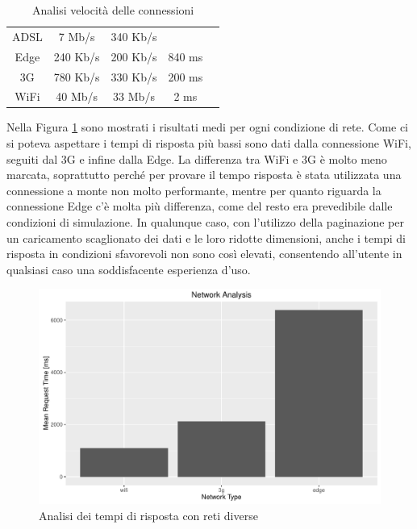 \begin{table}[ht]
	\caption{Analisi velocità delle connessioni}
	\label{table:connections-data-test}
	\begin{tabularx}{\textwidth}{CCCCC}
		\toprule
		 &  &  &   \\
		\midrule
			ADSL & 7 Mb/s & 340 Kb/s &\\ 
			\hline
			Edge & 240 Kb/s & 200 Kb/s & 840 ms \\ 
			3G  & 780 Kb/s & 330 Kb/s & 200 ms \\
			WiFi  & 40 Mb/s & 33 Mb/s & 2 ms \\
		\bottomrule
	\end{tabularx}
\end{table}

Nella Figura \ref{fig:network-time-analysis} sono mostrati i risultati medi per ogni condizione di rete. Come ci si poteva aspettare i tempi di risposta più bassi sono dati dalla connessione WiFi, seguiti dal 3G e infine dalla Edge. La differenza tra WiFi e 3G è molto meno marcata, soprattutto perché per provare il tempo risposta è stata utilizzata una connessione a monte non molto performante, mentre per quanto riguarda la connessione Edge c'è molta più differenza, come del resto era prevedibile dalle condizioni di simulazione. In qualunque caso, con l'utilizzo della paginazione per un caricamento scaglionato dei dati e le loro ridotte dimensioni, anche i tempi di risposta in condizioni sfavorevoli non sono così elevati, consentendo all'utente in qualsiasi caso una soddisfacente esperienza d'uso.

\begin{figure}[h]
	\centering
	\includegraphics[width=\textwidth]{7-performance/Immagini/network_time_analysis.pdf}
	\caption{Analisi dei tempi di risposta con reti diverse}\label{fig:network-time-analysis}
\end{figure}
